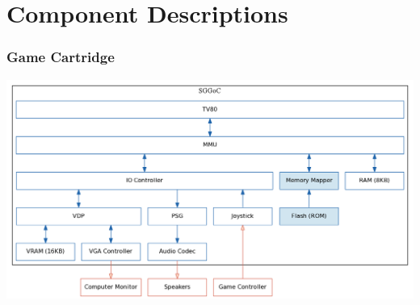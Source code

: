 \documentclass{beamer}
\begin{document}
\section{Component Descriptions}
\begin{frame}
    \frametitle{Game Cartridge}
    \begin{center}
        \includegraphics[width=\textwidth]{../block_diagrams/block_diagram_internal_cart.png}
    \end{center}
\end{frame}
\end{document}
